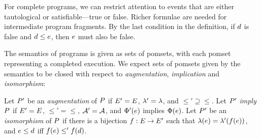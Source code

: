 For complete programs, we can restrict attention to events that are either
tautological or satisfiable---true or false.  Richer formulae are needed for
intermediate program fragments.  By the last condition in the definition, if
$d$ is false and $d\le e$, then $e$ must also be false.







The semantics of programs is given as sets of pomsets, with each pomset
representing a completed execution.
%
We expect sets of pomsets given by the semantics to be closed with
respect to \emph{augmentation}, \emph{implication} and \emph{isomorphism}:
\begin{definition}
  Let
  $P'$ be an \emph{augmentation} of $P$ if $E'=E$,
  ${\lambda'}={\lambda}$, and ${\le'}\supseteq{\le}$. %
  Let
  $P'$ \emph{imply} $P$ if $E'=E$, ${\le'}={\le}$,
  $\mathcal{A}'=\mathcal{A}$, and $\Phi'(e)$
  implies $\Phi(e)$. %
  Let
  $P'$ be an \emph{isomorphism} of $P$ if there is a bijection
  $f:E\mathbin\rightarrow E'$ such that $\lambda(e)=\lambda'(f(e))$, and
  $e\le d$ iff $f(e)\le'f(d)$. %
\end{definition}


